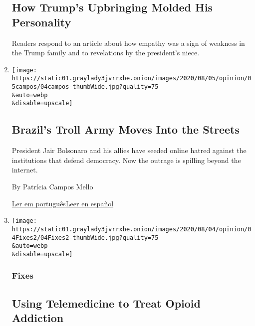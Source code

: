 \begin{enumerate}
  \hypertarget{how-trumps-upbringing-molded-his-personality}{%
  \subsection{How Trump's Upbringing Molded His
  Personality}\label{how-trumps-upbringing-molded-his-personality}}

  Readers respond to an article about how empathy was a sign of weakness
  in the Trump family and to revelations by the president's niece.
\item
  \href{/2020/08/04/opinion/bolsonaro-office-of-hate-brazil.html}{}

  \texttt{[image: https://static01.graylady3jvrrxbe.onion/images/2020/08/05/opinion/05campos/04campos-thumbWide.jpg?quality=75\\\&auto=webp\\\&disable=upscale]}

  \hypertarget{brazils-troll-army-moves-into-the-streets}{%
  \subsection{Brazil's Troll Army Moves Into the
  Streets}\label{brazils-troll-army-moves-into-the-streets}}

  President Jair Bolsonaro and his allies have seeded online hatred
  against the institutions that defend democracy. Now the outrage is
  spilling beyond the internet.

  By Patrícia Campos Mello

  \href{https://www.nytimes3xbfgragh.onion/pt/2020/08/04/opinion/international-world/bolsonaro-gabinete-do-odio.html}{Ler
  em
  português}\href{https://www.nytimes3xbfgragh.onion/es/2020/08/04/espanol/opinion/bolsonaro-oficina-odio-brasil.html}{Leer
  en español}
\item
  \href{/2020/08/04/opinion/opioid-telemedicine-covid.html}{}

  \texttt{[image: https://static01.graylady3jvrrxbe.onion/images/2020/08/04/opinion/04Fixes2/04Fixes2-thumbWide.jpg?quality=75\\\&auto=webp\\\&disable=upscale]}

  \hypertarget{fixes}{%
  \subsubsection{Fixes}\label{fixes}}

  \hypertarget{using-telemedicine-to-treat-opioid-addiction}{%
  \subsection{Using Telemedicine to Treat Opioid
  Addiction}\label{using-telemedicine-to-treat-opioid-addiction}}


\end{enumerate}
